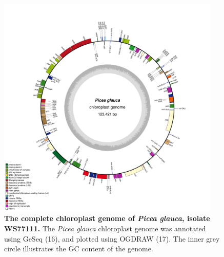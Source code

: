 \documentclass[titlepage,11pt, oneside]{article}   	%
\begin{document}
\begin{figure}[h]
\centering
\includegraphics[width=0.95\textwidth]{WS77111}
\caption{\textbf{The complete chloroplast genome of \textit{Picea glauca}, isolate WS77111.} The \textit{Picea glauca} chloroplast genome was annotated using GeSeq (16), and plotted using OGDRAW (17). The inner grey circle illustrates the GC content of the genome.}
\label{fig:ogdraw}
\end{figure}
\end{document}
